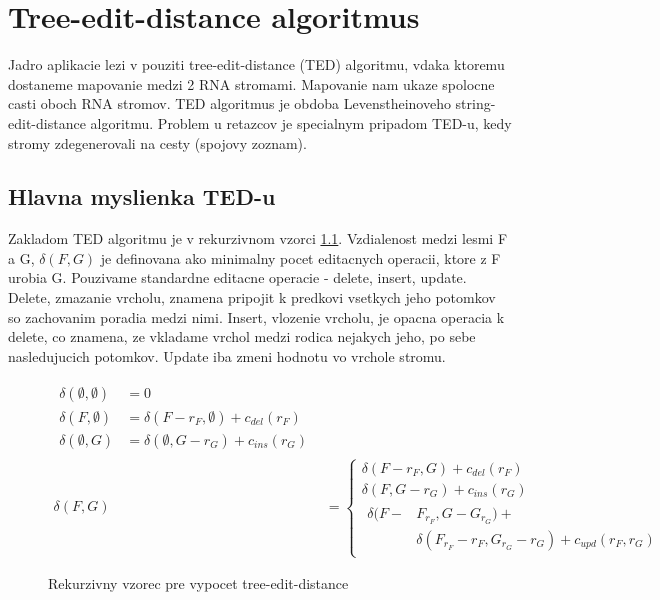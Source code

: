 
\chapter{Tree-edit-distance algoritmus}

Jadro aplikacie lezi v pouziti tree-edit-distance (TED) algoritmu,
vdaka ktoremu dostaneme mapovanie medzi 2 RNA stromami. Mapovanie nam ukaze
spolocne casti oboch RNA stromov. TED algoritmus je obdoba Levenstheinoveho
string-edit-distance algoritmu. Problem u retazcov je specialnym pripadom
TED-u, kedy stromy zdegenerovali na cesty (spojovy zoznam).

\section{Hlavna myslienka TED-u}

Zakladom TED algoritmu je v rekurzivnom vzorci \ref{eq:ted}. Vzdialenost medzi
lesmi F a G, $\delta(F, G)$ je definovana ako minimalny pocet editacnych operacii,
ktore z F urobia G. Pouzivame standardne editacne operacie - delete, insert, update.
Delete, zmazanie vrcholu, znamena pripojit k predkovi vsetkych jeho potomkov so
zachovanim poradia medzi nimi. Insert, vlozenie vrcholu, je opacna operacia k
delete, co znamena, ze vkladame vrchol medzi rodica nejakych jeho, po sebe
nasledujucich potomkov. Update iba zmeni hodnotu vo vrchole stromu.

\begin{figure}[H]
\begin{subequations}
\begin{align}
	\begin{split}
	\delta(\emptyset, \emptyset) &=
		0
		\\
	\delta(F, \emptyset) &=
		\delta(F - r_{F}, \emptyset) + c_{del}(r_{F})
		\\
	\delta(\emptyset, G) &=
		\delta(\emptyset, G - r_{G}) + c_{ins}(r_{G})
	\end{split}
	\\[1ex]
	\delta(F, G) &=
		\begin{cases}
			\delta(F - r_{F}, G) + c_{del}(r_{F}) \\
			\delta(F, G - r_{G}) + c_{ins}(r_{G}) \\
			\!
			\begin{aligned}
				\delta(F -& F_{r_{F}}, G - G_{r_{G}}) + \\
				& \delta(F_{r_{F}} - r_{F}, G_{r_{G}} - r_{G}) + c_{upd}(r_{F}, r_{G})
			\end{aligned}
		\end{cases}
\end{align}
\end{subequations}
\label{eq:ted} \caption{Rekurzivny vzorec pre vypocet tree-edit-distance}
\end{figure}

\citet{RTED}
\\



